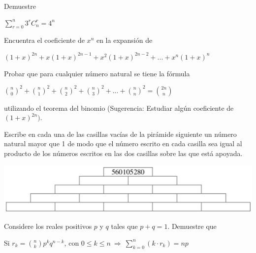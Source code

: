 \documentclass[12pt]{article}
\begin{document}
\begin{ejercicio}
    Demuestre

    \begin{center}
        $\sum_{r=0}^{n} 3^{r} C^{r}_{n} = 4^{n}$
    \end{center}
\end{ejercicio}

\begin{ejercicio}
    Encuentra el coeficiente de $x^n$ en la expansión de

    \begin{center}
        $(1+x)^{2n} + x (1+x)^{2n-1} + x^2 (1+x)^{2n-2} + ... + x^n (1+x)^{n}$
    \end{center}
\end{ejercicio}

\begin{ejercicio}
    Probar que para cualquier número natural se tiene la fórmula

    \begin{center}
        $\binom{n}{0}^2 + \binom{n}{1}^2 + \binom{n}{2}^2 + \binom{n}{3}^2 + ... + \binom{n}{n}^2 = \binom{2n}{n}$
    \end{center}

    utilizando el teorema del binomio (Sugerencia: Estudiar algún coeficiente de $(1 +x)^{2n})$.
\end{ejercicio}

\begin{ejercicio}
    Escribe en cada una de las casillas vacías de la pirámide siguiente un número natural mayor que 1 de modo que el número escrito en cada casilla sea igual al producto de los números escritos en las dos casillas sobre las que está apoyada.

    \begin{center}
        \includegraphics[scale=0.6]{Imagenes/IMG5/Piramide.png}
    \end{center}
\end{ejercicio}

\begin{ejercicio}
    Considere los reales positivos $p$ y $q$ tales que $p+q=1$. Demuestre que

    \begin{center}
        Si $r_k = \binom{n}{k} p^{k}q^{n-k}$, con $0 \leq k \leq n \ \Rightarrow \ \sum_{k=0}^{n} (k \cdot r_k) = np$
    \end{center}
\end{ejercicio}
\end{document}

